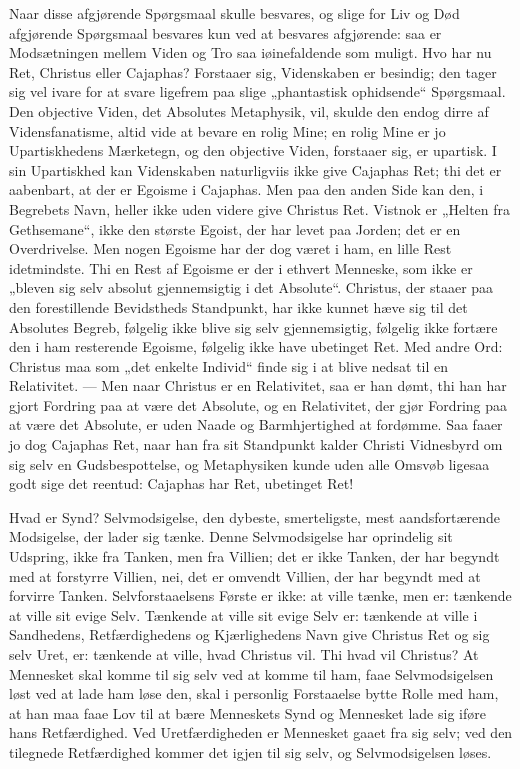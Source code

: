 \documentclass[12pt]{book}
\begin{document}
Naar disse afgjørende Spørgsmaal skulle besvares, og slige for Liv
og Død afgjørende Spørgsmaal besvares kun ved at besvares
afgjørende: saa er Modsætningen mellem Viden og Tro saa
iøinefaldende som muligt. Hvo har
nu Ret, Christus eller Cajaphas? Forstaaer sig, Videnskaben er
besindig; den tager sig vel ivare for at svare ligefrem paa slige
„phantastisk ophidsende“ Spørgsmaal. Den objective Viden, det
Absolutes Metaphysik, vil, skulde den endog dirre af
Vidensfanatisme, altid vide at bevare en rolig Mine; en rolig Mine
er jo Upartiskhedens Mærketegn, og den objective Viden, forstaaer
sig, er upartisk. I sin Upartiskhed kan Videnskaben naturligviis
ikke give Cajaphas Ret; thi det er aabenbart, at der er Egoisme i
Cajaphas. Men paa den anden Side kan den, i Begrebets Navn, heller
ikke uden videre give Christus Ret. Vistnok er „Helten fra
Gethsemane“, ikke den største Egoist, der har levet paa Jorden; det
er en Overdrivelse. Men nogen Egoisme har der dog været i ham, en
lille Rest idetmindste. Thi en Rest af Egoisme er der i ethvert
Menneske, som ikke er „bleven sig selv absolut gjennemsigtig i det
Absolute“. Christus, der staaer paa den forestillende Bevidstheds
Standpunkt, har ikke kunnet hæve sig til det Absolutes Begreb,
følgelig ikke blive sig selv gjennemsigtig, følgelig ikke fortære
den i ham resterende Egoisme, følgelig ikke have ubetinget Ret. Med
andre Ord: Christus maa som „det enkelte Individ“ finde sig i at
blive nedsat til en Relativitet. --- Men naar Christus er en
Relativitet, saa er han dømt, thi han har gjort Fordring paa at være
det Absolute, og en Relativitet, der gjør Fordring paa at være det
Absolute, er uden Naade og Barmhjertighed at fordømme. Saa faaer jo
dog Cajaphas Ret, naar han fra sit Standpunkt kalder Christi
Vidnesbyrd om sig selv en Gudsbespottelse, og Metaphysiken kunde
uden alle Omsvøb ligesaa godt sige det reentud: Cajaphas har Ret,
ubetinget Ret!

Hvad er Synd? Selvmodsigelse, den dybeste, smerteligste, mest
aandsfortærende Modsigelse, der lader sig tænke. Denne
Selvmodsigelse har oprindelig sit Udspring, ikke fra Tanken, men fra
Villien; det er ikke Tanken,
der har begyndt med at forstyrre Villien, nei, det er omvendt
Villien, der har begyndt med at forvirre Tanken. Selvforstaaelsens
Første er ikke: at ville tænke, men er: tænkende at ville sit evige
Selv. Tænkende at ville sit evige Selv er: tænkende at ville i
Sandhedens, Retfærdighedens og Kjærlighedens Navn give Christus Ret
og sig selv Uret, er: tænkende at ville, hvad Christus vil. Thi hvad
vil Christus? At Mennesket skal komme til sig selv ved at komme til
ham, faae Selvmodsigelsen løst ved at lade ham løse den, skal i
personlig Forstaaelse bytte Rolle med ham, at han maa faae Lov til
at bære Menneskets Synd og Mennesket lade sig iføre hans
Retfærdighed. Ved Uretfærdigheden er Mennesket gaaet fra sig selv;
ved den tilegnede Retfærdighed kommer det igjen til sig selv, og
Selvmodsigelsen løses.
\end{document}
